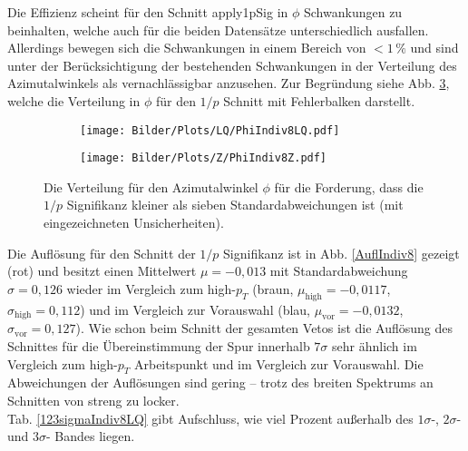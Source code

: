 Die Effizienz scheint für den Schnitt apply1pSig in $\phi$ Schwankungen zu beinhalten, welche auch für die beiden Datensätze unterschiedlich ausfallen. Allerdings bewegen sich die Schwankungen in einem Bereich von $<1\,\%$ und sind unter der Berücksichtigung der bestehenden Schwankungen in der Verteilung des Azimutalwinkels als vernachlässigbar anzusehen. Zur Begründung siehe Abb. \ref{PhiIndiv8}, welche die Verteilung in $\phi$ für den $1/p$ Schnitt mit Fehlerbalken darstellt.

\begin{figure}
  \begin{subfigure}[t]{0.55\textwidth}
  \texttt{[image: Bilder/Plots/LQ/PhiIndiv8LQ.pdf]}
  \label{PhiIndiv8LQ}
  \end{subfigure}
\begin{subfigure}[t]{0.55\textwidth}
 \texttt{[image: Bilder/Plots/Z/PhiIndiv8Z.pdf]}
  \label{PhilIndiv8Z}
\end{subfigure}
\caption{Die Verteilung für den Azimutalwinkel $\phi$ für die Forderung, dass die $1/p$ Signifikanz kleiner als sieben Standardabweichungen ist (mit eingezeichneten Unsicherheiten).}
\label{PhiIndiv8}
\end{figure}  
Die Auflösung für den Schnitt der $1/p$ Signifikanz ist in Abb. \ref{AuflIndiv8} gezeigt (rot) und besitzt einen Mittelwert $\mu=-0,013$ mit Standardabweichung $\sigma=0,126$ wieder im Vergleich zum high-$p_T$ (braun, $\mu_{\text{high}}=-0,0117$, $\sigma_{\text{high}}=0,112$) und im Vergleich zur Vorauswahl (blau, $\mu_{\text{vor}}=-0,0132$, $\sigma_{\text{vor}}=0,127$). Wie schon beim Schnitt der gesamten Vetos ist die Auflösung des Schnittes für die Übereinstimmung der Spur innerhalb $7\sigma$ sehr ähnlich im Vergleich zum high-$p_T$ Arbeitspunkt und im Vergleich zur Vorauswahl. Die Abweichungen der Auflösungen sind gering -- trotz des breiten Spektrums an Schnitten von streng zu locker.\\
Tab. \ref{123sigmaIndiv8LQ} gibt Aufschluss, wie viel Prozent außerhalb des $1\sigma$-, $2\sigma$- und $3\sigma$- Bandes liegen. 

